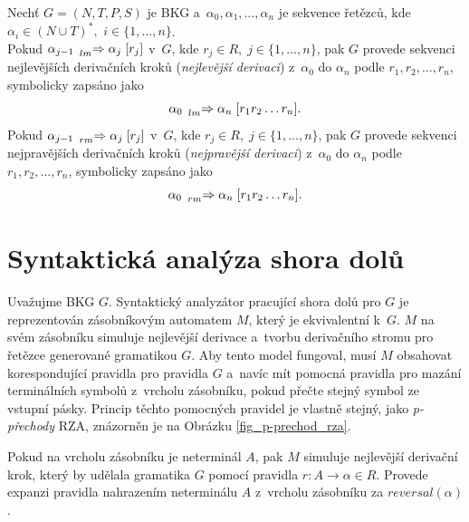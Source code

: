 \begin{definition}\label{def_sekvence_nejl_nejpr_der}
    Nechť $G = (N, T, P, S)$ je BKG a~$\alpha_0, \alpha_1, \ldots, \alpha_n$ je sekvence řetězců, kde $\alpha_i \in (N \cup T)^*,$ $i \in \{1, \ldots, n\}$.\\
    Pokud $\alpha_{j-1}\; \prescript{}{\scriptstyle lm}{\Rightarrow}\; \alpha_j\; [r_j]$ v~$G$, kde $r_j \in R,\; j \in \{1, \ldots, n\}$, pak $G$ provede sekvenci nejlevějších derivačních kroků (\emph{nejlevější derivaci}) z~$\alpha_0$ do $\alpha_n$ podle $r_1, r_2, \ldots, r_n$, symbolicky zapsáno jako
    \begin{equation*}
        \alpha_0\; \prescript{}{\scriptstyle lm}{\Rightarrow}\; \alpha_n\; [r_1r_2\ldots r_n].
    \end{equation*} 
    Pokud $\alpha_{j-1}\; \prescript{}{\scriptstyle rm}{\Rightarrow}\; \alpha_j\; [r_j]$ v~$G$, kde $r_j \in R,\; j \in \{1, \ldots, n\}$, pak $G$ provede sekvenci nejpravějších derivačních kroků (\emph{nejpravější derivaci}) z~$\alpha_0$ do $\alpha_n$ podle $r_1, r_2, \ldots, r_n$, symbolicky zapsáno jako
    \begin{equation*}
        \alpha_0\; \prescript{}{\scriptstyle rm}{\Rightarrow}\; \alpha_n\; [r_1r_2\ldots r_n].
    \end{equation*}
\end{definition}

\section{Syntaktická analýza shora dolů}\label{kap_sa_shora_dolu}
Uvažujme BKG $G$.
Syntaktický analyzátor pracující shora dolů pro $G$ je reprezentován zásobníkovým automatem $M$, který je ekvivalentní k~$G$.
$M$ na svém zásobníku simuluje nejlevější derivace a~tvorbu derivačního stromu pro řetězce generované gramatikou $G$.
Aby tento model fungoval, musí $M$ obsahovat korespondující pravidla pro pravidla $G$ a~navíc mít pomocná pravidla pro mazání terminálních symbolů z~vrcholu zásobníku, pokud přečte stejný symbol ze vstupní pásky.
Princip těchto pomocných pravidel je vlastně stejný, jako \emph{p-přechody} RZA, znázorněn je na Obrázku \ref{fig_p-prechod_rza}.

Pokud na vrcholu zásobníku je neterminál $A$, pak $M$ simuluje nejlevější derivační krok, který by udělala gramatika $G$ pomocí pravidla $r: A \rightarrow \alpha \in R$.
Provede expanzi pravidla nahrazením neterminálu $A$ z~vrcholu zásobníku za $reversal(\alpha)$. 

